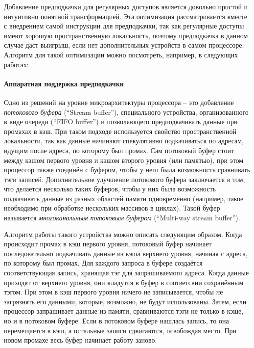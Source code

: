 \documentclass[12pt,a4paper]{article}
\begin{document}
Добавление предподкачки для регулярных доступов является довольно простой и интуитивно понятной трансформацией. Эта оптимизация рассматривается вместе с внедрением самой инструкции для предподкачки, так как регулярные доступы имеют хорошую пространственную локальность, поэтому предподкачка в данном случае даст выигрыш, если нет дополнительных устройств в самом процессоре. Алгоритм для такой оптимизации можно посмотреть, например, в следующих работах: %

\paragraph{Аппаратная поддержка предподкачки}

Одно из решений на уровне микроархитектуры процессора -- это добавление \emph{потокового буфера} (``Stream buffer''), специального устройства, организованного в виде очереди (``FIFO buffer'') и позволяющего предподкачивать данные при промахах в кэш. При таком подходе используется свойство пространственной локальности, так как данные начинают спекулятивно подкачиваться по адресам, идущим после адреса, по которому был промах. Сам потоковый буфер стоит между кэшом первого уровня и кэшом второго уровня (или памятью), при этом процессор также соединён с буфером, чтобы у него была возможность сравнивать тэги записей. Дополнительное улучшение потокового буфера заключается в том, что делается несколько таких буферов, чтобы у них была возможность подкачивать данные из разных областей памяти одновременно (например, такое необходимо при обработке нескольких массивов в циклах). Такой буфер называется \emph{многоканальным потоковым буфером} (``Multi-way stream buffer'').

Алгоритм работы такого устройства можно описать следующим образом. Когда происходит промах в кэш первого уровня, потоковый буфер начинает последовательно подкачивать данные из кэша верхнего уровня, начиная с адреса, по которому был промах. Для каждого запроса в буфере создаётся соответствующая запись, хранящая тэг для запрашиваемого адреса. Когда данные приходят от верхнего уровня, они кладутся в буфер в соответсвии сохранённым тэгом. При этом в кэш первого уровня ничего не записывается, чтобы не загрязнять его данными, которые, возможно, не будут использованы. Затем, если процессор запрашивает данные из памяти, сравниваются тэги не только в кэше, но и в потоковом буфере. Если в потоковом буфере нашлась запись, то она перемещается в кэш, а остальные записи сдвигаются, освобождая место. При новом промахе весь буфер начинает работу заново.
\end{document}
